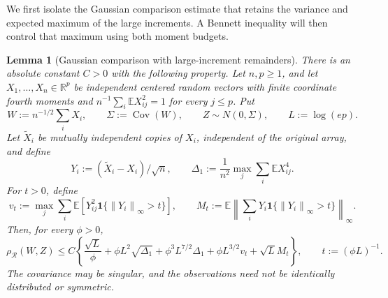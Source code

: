 \documentclass[11pt,letterpaper]{article}
\newenvironment{recovered}{\color{magenta}}{}
\newtheorem{lemma}{Lemma}
\theoremstyle{remark}
\newcommand{\E}{\mathbb E}
\newcommand{\R}{\mathbb R}
\newcommand{\Cov}{\operatorname{Cov}}
\newcommand{\norm}[1]{\left\lVert#1\right\rVert}
\newcommand{\rh}{\rho_{\mathcal R}}
\newcommand{\ind}{\mathbf 1}
\begin{document}
\begin{recovered}
We first isolate the Gaussian comparison estimate that retains the
variance and expected maximum of the large increments. A Bennett
inequality will then control that maximum using both moment budgets.

\begin{lemma}[Gaussian comparison with large-increment remainders]
\label{ben:comparison}
There is an absolute constant \(C>0\) with the following property.
Let \(n,p\ge1\), and let \(X_1,\ldots,X_n\in\R^p\) be independent
centered random vectors with finite coordinate fourth moments and
\(n^{-1}\sum_i\E X_{ij}^2=1\) for every \(j\le p\). Put
\[
 W:=n^{-1/2}\sum_iX_i,\qquad \Sigma:=\Cov(W),\qquad
 Z\sim N(0,\Sigma),\qquad L:=\log(ep).
\]
Let \(\widetilde X_i\) be mutually independent copies of \(X_i\),
independent of the original array, and define
\[
 Y_i:=(\widetilde X_i-X_i)/\sqrt n,\qquad
 \Delta_1:=\frac1{n^2}\max_j\sum_i\E X_{ij}^4.
\]
For \(t>0\), define
\[
 v_t:=\max_j\sum_i\E[Y_{ij}^2\ind\{\norm{Y_i}_\infty>t\}],
 \qquad M_t:=\E\norm{\sum_iY_i\ind\{\norm{Y_i}_\infty>t\}}_\infty.
\]
Then, for every \(\phi>0\),
\begin{equation}
 \rh(W,Z)\le C\left\{
 \frac{\sqrt L}{\phi}+\phi L^2\sqrt{\Delta_1}
 +\phi^3L^{7/2}\Delta_1+\phi L^{3/2}v_t+\sqrt L M_t\right\},
 \qquad t:=(\phi L)^{-1}.
 \label{ben:master}
\end{equation}
The covariance may be singular, and the observations need not be
identically distributed or symmetric.
\end{lemma}
\end{recovered}
\end{document}
